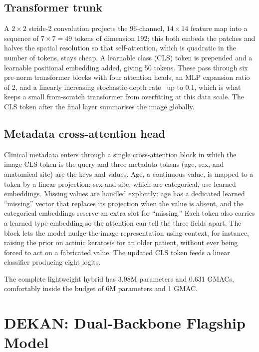 \subsection{Transformer trunk}

A $2\times2$ stride-2 convolution projects the $96$-channel, $14\times14$ feature
map into a sequence of $7\times7 = 49$ tokens of dimension 192; this both embeds
the patches and halves the spatial resolution so that self-attention, which is
quadratic in the number of tokens, stays cheap. A learnable class (CLS) token is
prepended and a learnable positional embedding added, giving 50 tokens. These
pass through six pre-norm transformer blocks with four attention heads, an MLP
expansion ratio of 2, and a linearly increasing stochastic-depth
rate~\cite{huang2016stochasticdepth} up to 0.1, which is what keeps a small
from-scratch transformer from overfitting at this data scale. The CLS token after
the final layer summarises the image globally.

\subsection{Metadata cross-attention head}

Clinical metadata enters through a single cross-attention block in which the
image CLS token is the query and three metadata tokens (age, sex, and
anatomical site) are the keys and values. Age, a continuous value, is mapped
to a token by a linear projection; sex and site, which are categorical, use
learned embeddings. Missing values are handled explicitly: age has a dedicated
learned ``missing'' vector that replaces its projection when the value is absent,
and the categorical embeddings reserve an extra slot for ``missing.'' Each token
also carries a learned type embedding so the attention can tell the three fields
apart. The block lets the model nudge the image representation using context,
for instance, raising the prior on actinic keratosis for an older patient,
without ever being forced to act on a fabricated value. The updated CLS token
feeds a linear classifier producing eight logits.

The complete lightweight hybrid has 3.98M parameters and 0.631 GMACs, comfortably
inside the budget of 6M parameters and 1 GMAC.

\section{DEKAN: Dual-Backbone Flagship Model}

